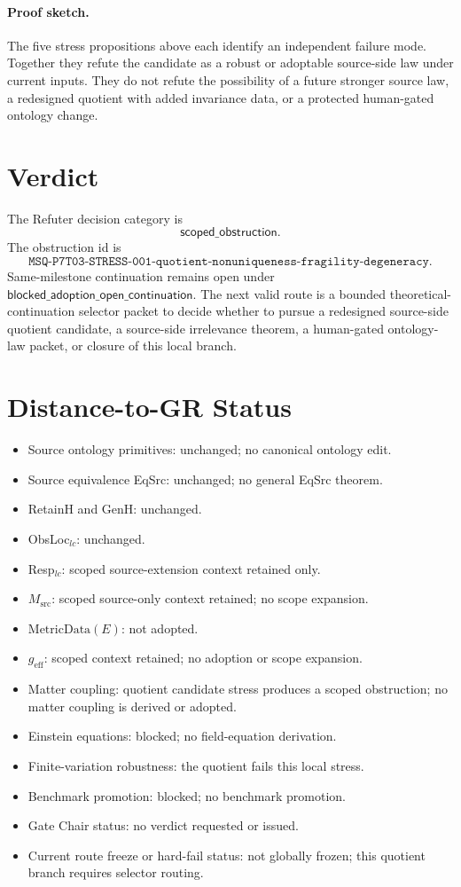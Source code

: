 \paragraph{Proof sketch.}
The five stress propositions above each identify an independent failure mode.
Together they refute the candidate as a robust or adoptable source-side law
under current inputs. They do not refute the possibility of a future stronger
source law, a redesigned quotient with added invariance data, or a protected
human-gated ontology change.

\section{Verdict}

The Refuter decision category is
\[
  \mathsf{scoped\_obstruction}.
\]
The obstruction id is
\[
  \texttt{MSQ-P7T03-STRESS-001-quotient-nonuniqueness-fragility-degeneracy}.
\]
Same-milestone continuation remains open under
\(\mathsf{blocked\_adoption\_open\_continuation}\). The next valid route is a
bounded theoretical-continuation selector packet to decide whether to pursue a
redesigned source-side quotient candidate, a source-side irrelevance theorem,
a human-gated ontology-law packet, or closure of this local branch.

\section{Distance-to-GR Status}

\begin{itemize}
  \item Source ontology primitives: unchanged; no canonical ontology edit.
  \item Source equivalence EqSrc: unchanged; no general EqSrc theorem.
  \item RetainH and GenH: unchanged.
  \item ObsLoc\(_{lc}\): unchanged.
  \item Resp\(_{lc}\): scoped source-extension context retained only.
  \item \(M_{\mathrm{src}}\): scoped source-only context retained; no scope
    expansion.
  \item \(\mathrm{MetricData}(E)\): not adopted.
  \item \(g_{\mathrm{eff}}\): scoped context retained; no adoption or scope
    expansion.
  \item Matter coupling: quotient candidate stress produces a scoped
    obstruction; no matter coupling is derived or adopted.
  \item Einstein equations: blocked; no field-equation derivation.
  \item Finite-variation robustness: the quotient fails this local stress.
  \item Benchmark promotion: blocked; no benchmark promotion.
  \item Gate Chair status: no verdict requested or issued.
  \item Current route freeze or hard-fail status: not globally frozen; this
    quotient branch requires selector routing.
\end{itemize}

